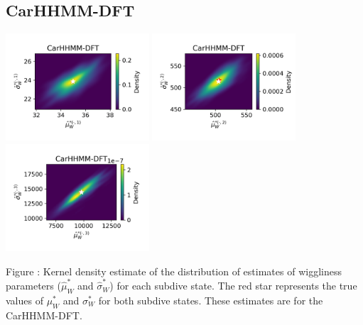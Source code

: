 \documentclass{article}
\begin{document}
        \subsection{CarHHMM-DFT}
        \begin{center}
        \includegraphics[width=2.1in]{../Plots/hhmm_FV_MLE_density_FoVeDBA_0_0.png}
        \includegraphics[width=2.1in]{../Plots/hhmm_FV_MLE_density_FoVeDBA_0_1.png}
        \includegraphics[width=2.1in]{../Plots/hhmm_FV_MLE_density_FoVeDBA_0_2.png}
        \end{center}
        
        \noindent Figure : Kernel density estimate of the distribution of estimates of wiggliness parameters ($\hat \mu^*_W$ and $\hat \sigma^*_W$) for each subdive state. The red star represents the true values of $\mu^*_W$ and $\sigma^*_W$ for both subdive states. These estimates are for the CarHHMM-DFT.
        \addtocounter{fignum}{1}
        
\end{document}
